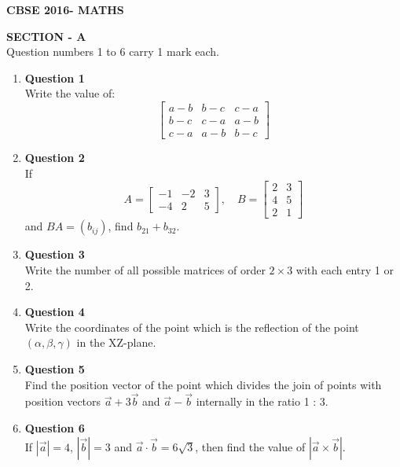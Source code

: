 \documentclass[12pt]{article}
\begin{document}
\pagestyle{fancy}
\fancyhf{}

\begin{center}
\Large\textbf{CBSE 2016- MATHS}
\end{center}
\begin{center}
    \Large \textbf{SECTION - A} \\
    \normalsize
    Question numbers 1 to 6 carry 1 mark each.
\end{center}

\vspace{1em}
\begin{enumerate}

\item \textbf{Question 1}\\
Write the value of:
\[
\begin{bmatrix}
a - b & b - c & c - a \\
b - c & c - a & a - b \\
c - a & a - b & b - c
\end{bmatrix}
\]

\item \textbf{Question 2}\\
If 
\[
A = \begin{bmatrix} -1 & -2 & 3 \\ -4 & 2 & 5 \end{bmatrix}, 
\quad B = \begin{bmatrix} 2 & 3 \\ 4 & 5 \\ 2 & 1 \end{bmatrix}
\]
and \( BA = (b_{ij}) \), find \( b_{21} + b_{32} \).

\item \textbf{Question 3}\\
Write the number of all possible matrices of order \( 2 \times 3 \) with each entry 1 or 2.

\item \textbf{Question 4}\\
Write the coordinates of the point which is the reflection of the point \( (\alpha, \beta, \gamma) \) in the XZ-plane.

\item \textbf{Question 5} \\
Find the position vector of the point which divides the join of points with position vectors $\vec{a} + 3\vec{b}$ and $\vec{a} - \vec{b}$ internally in the ratio 1 : 3.

\item \textbf{Question 6} \\
If $|\vec{a}| = 4$, $|\vec{b}| = 3$ and $\vec{a} \cdot \vec{b} = 6\sqrt{3}$, then find the value of $|\vec{a} \times \vec{b}|$.

\end{enumerate}
\end{document}
